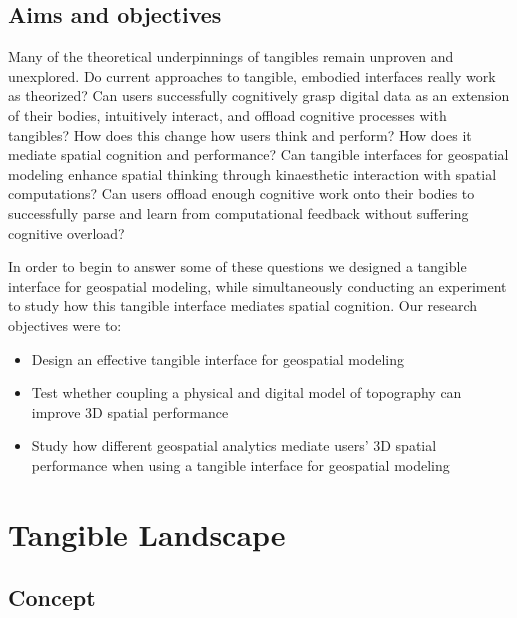 \documentclass[prodmode,acmtochi]{acmsmall} %
\begin{document}
\subsection{Aims and objectives}

Many of the theoretical underpinnings of tangibles 
remain unproven and unexplored. 
Do current approaches to tangible, embodied interfaces
really work as theorized? 
Can users successfully
cognitively grasp digital data as an extension of their bodies,
intuitively interact, 
and offload cognitive processes
with tangibles?
How does this change how users think and perform?
How does it mediate spatial cognition and performance? 
Can tangible interfaces for geospatial modeling 
enhance spatial thinking
through kinaesthetic interaction with 
spatial computations?
Can users offload enough cognitive work onto their bodies
to successfully parse and learn from computational feedback
without suffering cognitive overload?

In order to begin to answer some of these questions we 
designed a tangible interface for geospatial modeling, 
while simultaneously conducting an experiment
to study how this tangible interface mediates spatial cognition.
%
Our research objectives were to:
%
\begin{itemize}
\item Design an effective tangible interface for geospatial modeling
\item Test whether coupling a physical and digital model of topography can improve 3D spatial performance
\item Study how different geospatial analytics mediate users' 3D spatial performance when using a tangible interface for geospatial modeling
\end{itemize}


\section{Tangible Landscape}

\subsection{Concept}

% 
%
% 
\end{document}
